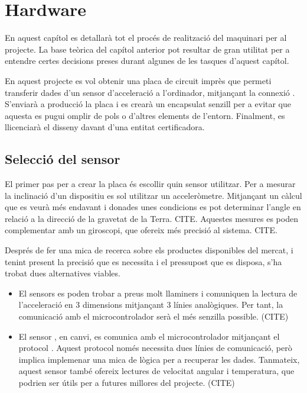 \chapter{Hardware}

En aquest capítol es detallarà tot el procés de realització del maquinari per
al projecte. La base teòrica del capítol anterior pot resultar de gran utilitat
per a entendre certes decisions preses durant algunes de les tasques d'aquest
capítol.

En aquest projecte es vol obtenir una placa de circuit imprès que permeti
transferir dades d'un sensor d'acceleració a l'ordinador, mitjançant la connexió
. S'enviarà a producció la placa i es crearà un encapsulat senzill per
a evitar que aquesta es pugui omplir de pols o d'altres elements de l'entorn.
Finalment, es llicenciarà el disseny davant d'una entitat certificadora.

\section{Selecció del sensor}
\label{sec:sensor_selection}

El primer pas per a crear la placa és escollir quin sensor utilitzar. Per a
mesurar la inclinació d'un dispositiu es sol utilitzar un acceleròmetre.
Mitjançant un càlcul que es veurà més endavant i donades unes condicions es pot
determinar l'angle en relació a la direcció de la gravetat de la Terra. CITE.
Aquestes mesures es poden complementar amb un giroscopi, que ofereix més
precisió al sistema. CITE.

Després de fer una mica de recerca sobre els productes disponibles del mercat,
i tenint present la precisió que es necessita i el pressupost que es disposa,
s'ha trobat dues alternatives viables.

\begin{itemize}
    \item El sensors  es poden trobar a preus molt llaminers i
    comuniquen la lectura de l'acceleració en 3 dimensions mitjançant 3 línies
    analògiques. Per tant, la comunicació amb el microcontrolador serà el més
    senzilla possible. (CITE)
    \item El sensor , en canvi, es comunica amb el microcontrolador
    mitjançant el protocol . Aquest protocol només necessita dues
    línies de comunicació, però implica implemenar una mica de lògica per a
    recuperar les dades. Tanmateix, aquest sensor també ofereix lectures de
    velocitat angular i temperatura, que podrien ser útils per a futures
    millores del projecte. (CITE)
\end{itemize}


